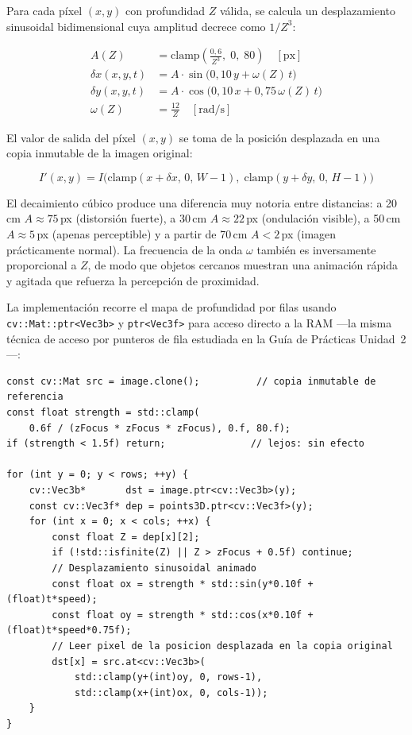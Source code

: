 \documentclass[12pt, a4paper]{article}
\begin{document}
Para cada píxel $(x,y)$ con profundidad $Z$ válida, se calcula un desplazamiento
sinusoidal bidimensional cuya amplitud decrece como $1/Z^3$:

\begin{equation}
\label{eq:distortion}
\begin{aligned}
  A(Z) &= \text{clamp}\!\left(\frac{0{,}6}{Z^3},\;0,\;80\right) \quad [\text{px}]\\[4pt]
  \delta x(x,y,t) &= A \cdot \sin\!\bigl(0{,}10\,y + \omega(Z)\,t\bigr)\\
  \delta y(x,y,t) &= A \cdot \cos\!\bigl(0{,}10\,x + 0{,}75\,\omega(Z)\,t\bigr)\\[4pt]
  \omega(Z) &= \frac{12}{Z} \quad [\text{rad/s}]
\end{aligned}
\end{equation}

El valor de salida del píxel $(x,y)$ se toma de la posición desplazada en una copia
inmutable de la imagen original:

\begin{equation}
\label{eq:warp}
  I'(x,y) = I\!\bigl(\text{clamp}(x+\delta x,\,0,\,W-1),\;
                      \text{clamp}(y+\delta y,\,0,\,H-1)\bigr)
\end{equation}

El decaimiento cúbico produce una diferencia muy notoria entre distancias:
a 20\,cm $A\approx75$\,px (distorsión fuerte), a 30\,cm $A\approx22$\,px
(ondulación visible), a 50\,cm $A\approx5$\,px (apenas perceptible) y a
partir de 70\,cm $A<2$\,px (imagen prácticamente normal).
La frecuencia de la onda $\omega$ también es inversamente proporcional a $Z$,
de modo que objetos cercanos muestran una animación rápida y agitada que
refuerza la percepción de proximidad.

La implementación recorre el mapa de profundidad por filas usando
\texttt{cv::Mat::ptr<Vec3b>} y \texttt{ptr<Vec3f>} para acceso directo a la RAM
—la misma técnica de acceso por punteros de fila estudiada en la Guía de Prácticas
Unidad~2 \cite{robles2026guia2}—:

\begin{lstlisting}[style=cppstyle, caption={Núcleo de la distorsión sinusoidal (ARRenderer.cpp).}]
const cv::Mat src = image.clone();          // copia inmutable de referencia
const float strength = std::clamp(
    0.6f / (zFocus * zFocus * zFocus), 0.f, 80.f);
if (strength < 1.5f) return;               // lejos: sin efecto

for (int y = 0; y < rows; ++y) {
    cv::Vec3b*       dst = image.ptr<cv::Vec3b>(y);
    const cv::Vec3f* dep = points3D.ptr<cv::Vec3f>(y);
    for (int x = 0; x < cols; ++x) {
        const float Z = dep[x][2];
        if (!std::isfinite(Z) || Z > zFocus + 0.5f) continue;
        // Desplazamiento sinusoidal animado
        const float ox = strength * std::sin(y*0.10f + (float)t*speed);
        const float oy = strength * std::cos(x*0.10f + (float)t*speed*0.75f);
        // Leer pixel de la posicion desplazada en la copia original
        dst[x] = src.at<cv::Vec3b>(
            std::clamp(y+(int)oy, 0, rows-1),
            std::clamp(x+(int)ox, 0, cols-1));
    }
}
\end{lstlisting}
\end{document}
